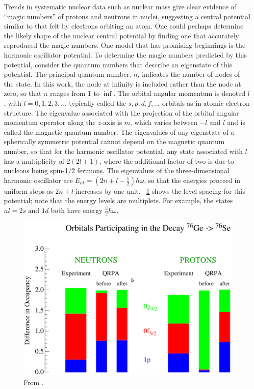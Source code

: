 Trends in systematic nuclear data such as nuclear mass give clear evidence of ``magic numbers'' of protons and neutrons in nuclei, suggesting a central potential similar to that felt by electrons orbiting an atom.  One could perhaps determine the likely shape of the nuclear central potential by finding one that accurately reproduced the magic numbers.  One model that has promising beginnings is the harmonic oscillator potential.  To determine the magic numbers predicted by this potential, consider the quantum numbers that describe an eigenstate of this potential.  The principal quantum number, $n$, indicates the number of nodes of the state.  In this work, the node at infinity is included rather than the node at zero, so that $n$ ranges from 1 to $\inf$.  The orbital angular momentum is denoted $l$, with $l = 0, 1, 2, 3, ...$ typically called the $s, p, d, f, ...$ orbitals as in atomic electron structure.  The eigenvalue associated with the projection of the orbital angular momentum operator along the $z$-axis is $m$, which varies between $-l$ and $l$ and is called the magnetic quantum number.  The eigenvalues of any eigenstate of a spherically symmetric potential cannot depend on the magnetic quantum number, so that for the harmonic oscillator potential, any state associated with $l$ has a multiplicity of $2(2l+1)$, where the additional factor of two is due to nucleons being spin-1/2 fermions.  The eigenvalues of the three-dimensional harmonic oscillator are $E_{nl} = (2n+l-\frac{1}{2})\hbar\omega$, so that the energies proceed in uniform steps as $2n+l$ increases by one unit.  {\fig}~\ref{fig:shellModelMagic} shows the level spacing for this potential; note that the energy levels are multiplets.  For example, the states $nl = 2s$ and $1d$ both have energy $\frac{3}{2}\hbar\omega$.  
\begin{figure}[htp]
\centering
\includegraphics[width=1.0\textwidth]{figures/occupancyDiffs.eps}
\caption{From \cite{Casten}.}
\label{fig:shellModelMagic}
\end{figure}
